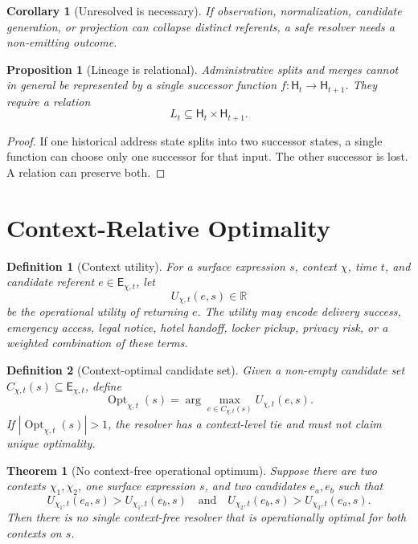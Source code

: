 \documentclass[11pt]{article}
\newtheorem{definition}{Definition}
\newtheorem{theorem}{Theorem}
\newtheorem{proposition}{Proposition}
\newtheorem{corollary}{Corollary}
\newcommand{\Ent}{\mathsf{E}}
\newcommand{\Hist}{\mathsf{H}}
\newcommand{\Opt}{\operatorname{Opt}}
\begin{document}
\begin{corollary}[Unresolved is necessary]
If observation, normalization, candidate generation, or projection can collapse
distinct referents, a safe resolver needs a non-emitting outcome.
\end{corollary}

\begin{proposition}[Lineage is relational]
Administrative splits and merges cannot in general be represented by a single
successor function \(f:\Hist_t\to\Hist_{t+1}\). They require a relation
\[
L_t \subseteq \Hist_t \times \Hist_{t+1}.
\]
\end{proposition}

\begin{proof}
If one historical address state splits into two successor states, a single
function can choose only one successor for that input. The other successor is
lost. A relation can preserve both.
\end{proof}

\section{Context-Relative Optimality}

\begin{definition}[Context utility]
For a surface expression \(s\), context \(\chi\), time \(t\), and candidate
referent \(e \in \Ent_{\chi,t}\), let
\[
U_{\chi,t}(e,s) \in \mathbb{R}
\]
be the operational utility of returning \(e\). The utility may encode delivery
success, emergency access, legal notice, hotel handoff, locker pickup, privacy
risk, or a weighted combination of these terms.
\end{definition}

\begin{definition}[Context-optimal candidate set]
Given a non-empty candidate set \(C_{\chi,t}(s)\subseteq\Ent_{\chi,t}\), define
\[
\Opt_{\chi,t}(s)
  = \arg\max_{e\in C_{\chi,t}(s)} U_{\chi,t}(e,s).
\]
If \(|\Opt_{\chi,t}(s)|>1\), the resolver has a context-level tie and must not
claim unique optimality.
\end{definition}

\begin{theorem}[No context-free operational optimum]
Suppose there are two contexts \(\chi_1,\chi_2\), one surface expression \(s\),
and two candidates \(e_a,e_b\) such that
\[
U_{\chi_1,t}(e_a,s)>U_{\chi_1,t}(e_b,s)
\quad\text{and}\quad
U_{\chi_2,t}(e_b,s)>U_{\chi_2,t}(e_a,s).
\]
Then there is no single context-free resolver that is operationally optimal for
both contexts on \(s\).
\end{theorem}
\end{document}

